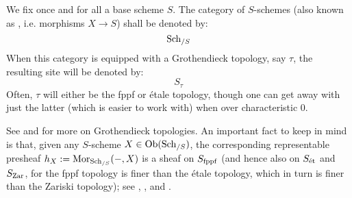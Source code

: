     \begin{convention}
        We fix once and for all a base scheme $S$. The category of $S$-schemes (also known as , i.e. morphisms $X \to S$) shall be denoted by:
            $$\mathrm{Sch}_{/S}$$
        When this category is equipped with a Grothendieck topology, say $\tau$, the resulting site will be denoted by:
            $$S_{\tau}$$
        Often, $\tau$ will either be the fppf or \'etale topology, though one can get away with just the latter (which is easier to work with) when over characteristic $0$.
    \end{convention}
    See \cite{vistoli_descent} and \cite[\href{https://stacks.math.columbia.edu/tag/00UZ}{Tag 00UZ}]{stacks-project} for more on Grothendieck topologies. An important fact to keep in mind is that, given any $S$-scheme $X \in \mathrm{Ob}(\mathrm{Sch}_{/S})$, the corresponding representable presheaf $h_X := \mathrm{Mor}_{\mathrm{Sch}_{/S}}(-, X)$ is a sheaf on $S_{\mathrm{fppf}}$ (and hence also on $S_{\mathrm{\acute{e}t}}$ and $S_{\mathrm{Zar}}$, for the fppf topology is finer than the \'etale topology, which in turn is finer than the Zariski topology); see \cite[\href{https://stacks.math.columbia.edu/tag/01JF}{Tag 01JF}]{stacks-project}, \cite[\href{https://stacks.math.columbia.edu/tag/020K}{Tag 020K}]{stacks-project}, and \cite[\href{https://stacks.math.columbia.edu/tag/0238}{Tag 0238}]{stacks-project}. 

